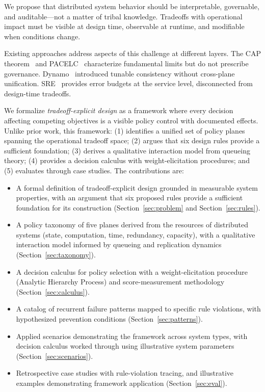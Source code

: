 \documentclass[conference]{IEEEtran}
\begin{document}
We propose that distributed system behavior should be interpretable, governable, and auditable---not a matter of tribal knowledge. Tradeoffs with operational impact must be visible at design time, observable at runtime, and modifiable when conditions change.

Existing approaches address aspects of this challenge at different layers. The CAP theorem~\cite{brewer2000cap,gilbert2002brewer,brewer2012cap} and PACELC~\cite{pacelc} characterize fundamental limits but do not prescribe governance. Dynamo~\cite{dynamo} introduced tunable consistency without cross-plane unification. SRE~\cite{sre} provides error budgets at the service level, disconnected from design-time tradeoffs.

We formalize \textit{tradeoff-explicit design} as a framework where every decision affecting competing objectives is a visible policy control with documented effects. Unlike prior work, this framework: (1) identifies a unified set of policy planes spanning the operational tradeoff space; (2) argues that six design rules provide a sufficient foundation; (3) derives a qualitative interaction model from queueing theory; (4) provides a decision calculus with weight-elicitation procedures; and (5) evaluates through case studies. The contributions are:


\begin{itemize}
    \item A formal definition of tradeoff-explicit design grounded in measurable system properties, with an argument that six proposed rules provide a sufficient foundation for its construction (Section~\ref{sec:problem} and Section~\ref{sec:rules}).
    \item A policy taxonomy of five planes derived from the resources of distributed systems (state, computation, time, redundancy, capacity), with a qualitative interaction model informed by queueing and replication dynamics (Section~\ref{sec:taxonomy}).
    \item A decision calculus for policy selection with a weight-elicitation procedure (Analytic Hierarchy Process) and score-measurement methodology (Section~\ref{sec:calculus}).
    \item A catalog of recurrent failure patterns mapped to specific rule violations, with hypothesized prevention conditions (Section~\ref{sec:patterns}).
    \item Applied scenarios demonstrating the framework across system types, with decision calculus worked through using illustrative system parameters (Section~\ref{sec:scenarios}).
    \item Retrospective case studies with rule-violation tracing, and illustrative examples demonstrating framework application (Section~\ref{sec:eval}).
\end{itemize}
\end{document}
